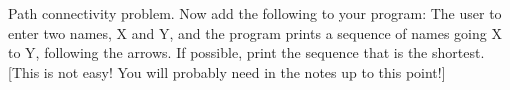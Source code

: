 Path connectivity problem. Now add the following to your program: The user to enter two names, X and Y, and the program prints a sequence of names going X to Y, following the arrows. If possible, print the sequence that is the shortest. [This is not easy! You will probably need  in the notes up to this point!]

